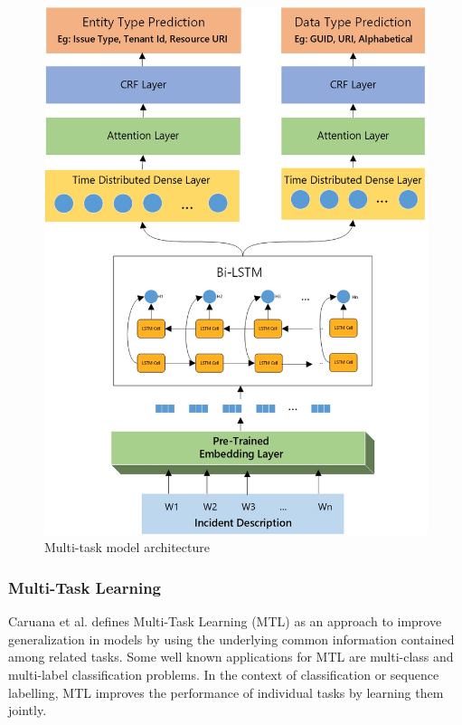 \begin{figure}%
\includegraphics[width=\linewidth]{Figures/MTL_Diagram.jpg}
\caption{Multi-task model architecture}
\label{model-arch}
\end{figure}

\subsubsection{\textbf{Multi-Task Learning}}

Caruana et al. \cite{caruana1997multitask} defines Multi-Task Learning (MTL) as an approach to improve generalization in models by using the underlying common information contained among related tasks. Some well known applications for MTL are multi-class and multi-label classification problems. In the context of classification or sequence labelling, MTL improves the performance of individual tasks by learning them jointly.


